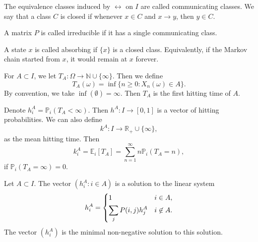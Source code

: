 \documentclass[12pt]{article}
\begin{document}
\begin{definition}
	The equivalence classes induced by $\leftrightarrow$ on $I$ are called communicating classes. We say that a class $C$ is closed if whenever $x \in C$ and $x \to y$, then $y \in C$.

	A matrix $P$ is called irreducible if it has a single communicating class.

	A state $x$ is called absorbing if $\{x\}$ is a closed class. Equivalently, if the Markov chain started from $x$, it would remain at $x$ forever.
\end{definition}

\begin{definition}
	For $A \subset I$, we let $T_A : \Omega \to \mathbb{N} \cup \{\infty\}$. Then we define
	\[
		T_A(\omega) = \inf \{n \geq 0 : X_n(\omega) \in A\}
	.\]
	By convention, we take $\inf(\emptyset) = \infty$. Then $T_A$ is the first hitting time of $A$.

	Denote $h_i^{A} = \mathbb{P}_i(T_A < \infty)$. Then $h^{A} : I \to [0, 1]$ is a vector of hitting probabilities. We can also define
	\[
		k^{A} : I \to \mathbb{R}_+ \cup \{\infty\}
	,\]
	as the mean hitting time. Then
	\[
		k_i^{A} = \mathbb{E}_i[T_A] = \sum_{n =  1}^{\infty }n \mathbb{P}_i(T_A = n)
	,\]
	if $\mathbb{P}_i(T_A = \infty) = 0$.
\end{definition}

\begin{theorem}
	Let $A \subset I$. The vector $(h_i^{A} : i \in A)$ is a solution to the linear system
	\[
	h_i^{A} =
	\begin{dcases}
		1 & i \in A, \\
		\sum_{j}P(i, j) h_j^{A} & i \not \in A.
	\end{dcases}
	\]
	The vector $(h_i^{A})$ is the minimal non-negative solution to this solution.
\end{theorem}
\end{document}
